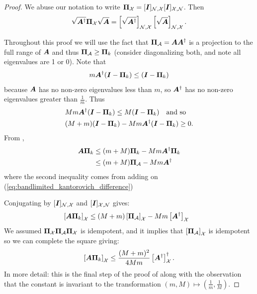 \begin{proof}
    We abuse our notation to write $\proj{X} = \matrsub[N,X]{I}\matrsub[X,N]{I}$. Then
    \begin{equation}        \sqrt{\matr{A}^{\dagger}}\proj{X}\sqrt{\matr{A}} = \msubgen[\set{N},\set{X}]{\sqrt{\matr{A}^{\dagger}}}\msubgen[\set{N},\set{X}]{\sqrt{\matr{A}}}.
    \end{equation}

    Throughout this proof we will use the fact that $\proj{A}= 
 \matr{A}\matr{A}^{\dagger}$ is a projection to the full range of $\bm{A}$ and thus $\proj{A} \geq \projgen{k}$ (consider diagonalizing both, and note all eigenvalues are 1 or 0).
    Note that
    \begin{equation}
        m\matr{A}^{\dagger}(\matr{I} - \projgen{k}) \leq (\matr{I} - \projgen{k})
    \end{equation}
    because $\bm{A}$ has no non-zero eigenvalues less than $m$, so $\bm{A}^{\dagger}$ has no non-zero eigenvalues greater than $\frac{1}{m}$. Thus 
    \begin{align}
        &Mm\matr{A}^{\dagger}(\matr{I} - \projgen{k}) \leq M(\matr{I} - \projgen{k}) \quad \text{and so} \\
        & (M+m)(\matr{I} - \projgen{k}) - Mm\matr{A}^{\dagger}(\matr{I} - \projgen{k})\geq 0. \label{eq:bandlimited_kantorovich_difference}
    \end{align}
    From \cite[Theorem 2, (3.3)]{baksalary1991generalized},
    \begin{align}
        \matr{A}\projgen{k} &\leq (m+M)\projgen{k} - Mm\matr{A}^{\dagger}\projgen{k} \\
        &\leq (m+M)\proj{A} - Mm\matr{A}^{\dagger}
    \end{align}
    where the second inequality comes from adding on (\ref{eq:bandlimited_kantorovich_difference})

    Conjugating by $\matrsub[N,X]{I}$ and $\matrsub[X,N]{I}$ gives:
    \begin{align}
        &\msubgen[\set{X}]{\matr{A}\projgen{k}} \leq (M+m)\msubgen[\set{X}]{\proj{A}} - Mm\msubgen[\set{X}]{\matr{A}^{\dagger}}
    \end{align}
    We assumed $\proj{X}\proj{A}\proj{X}$ is idempotent, and it implies that $\msubgen[\set{X}]{\proj{A}}$ is idempotent so we can complete the square giving:
    \begin{equation}
        \msubgen[\set{X}]{\matr{A}\projgen{k}} \leq \frac{(M+m)^{2}}{4Mm} \msubgen[\set{X}]{\matr{A}^{\dagger}}^{\dagger}. \label{eq:bandlimited_kantorovich_proof_inner}
    \end{equation}
    In more detail: this is the final step of the proof of \cite[Theorem 2]{baksalary1991generalized} along with the observation that the constant is invariant to the transformation  $(m,M) \mapsto \left(\frac{1}{m},\frac{1}{M} \right)$.


\end{proof}
